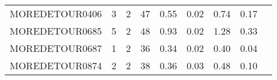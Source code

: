 {\begin{tabular}{l|r|r|r|r|r|r|r|l}
MOREDETOUR0406                              & 3                                                                                                 & 2                                                                                                & 47                                                                                                                   & 0.55                            & 0.02                    & {\color[HTML]{00009B} 0.74}    & 0.17                       & \cite{tracer2018}                                                  \\
MOREDETOUR0685                              & 5                                                                                                 & 2                                                                                                & 48                                                                                                                   & 0.93                            & 0.02                    & {\color[HTML]{00009B} 1.28}    & 0.33                       & \cite{tracer2018}                                                  \\
MOREDETOUR0687                              & 1                                                                                                 & 2                                                                                                & 36                                                                                                                   & 0.34                            & 0.02                    & {\color[HTML]{00009B} 0.40}    & 0.04                       & \cite{tracer2018}                                                  \\
MOREDETOUR0874                              & 2                                                                                                 & 2                                                                                                & 38                                                                                                                   & 0.36                            & 0.03                    & {\color[HTML]{00009B} 0.48}    & 0.10                       & \cite{tracer2018}                                   
\end{tabular}%
}